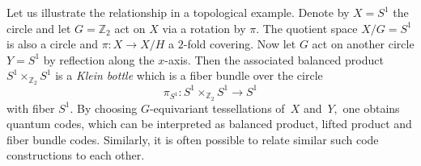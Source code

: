 \documentclass[amsmath, amssymb, floatfix, reprint, twocolumn, notitlepage, 10pt]{revtex4-1}
\begin{document}
Let us illustrate the relationship in a topological example. Denote by $X=S^1$ the circle and let $G=\mathbb{Z}_{2}$ act on $X$ via a rotation by $\pi.$ The quotient space $X/G=S^{1}$ is also a circle and $\pi: X\to X/H$ a $2$-fold covering. Now let  $G$ act on another circle $Y=S^{1}$ by reflection along the $x$-axis.
Then the associated balanced product
$S^{1}\times_{\mathbb{Z}_{2}}S^{1}$
is a \emph{Klein bottle} which is a fiber bundle over the circle
$$\pi_{S^1}:S^{1}\times_{\mathbb{Z}_{2}}S^{1}\to S^{1}$$
with fiber $S^{1}.$ By choosing $G$-equivariant tessellations of~$X$ and~$Y,$ one obtains quantum codes, which can be interpreted as balanced product, lifted product and fiber bundle codes.
Similarly, it is often possible to relate similar such code constructions to each other.


{}
\end{document}

